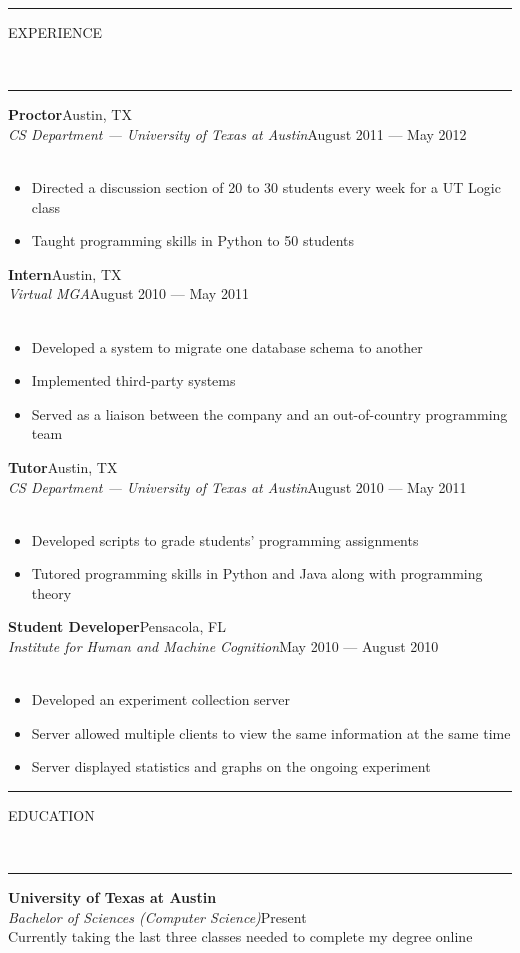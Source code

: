 \documentclass[10pt, letterpaper, oneside]{article}
\newcommand{\HRule}[2]{\textcolor{#1}{\rule{\linewidth}{#2}}}
\newcommand{\sectiontitle}[1]{\begin{minipage}{\textwidth}\HRule{black}{0.25mm}\vspace{-10pt}\begin{center}\Large\MakeUppercase{#1}\end{center}\end{minipage}\\\HRule{light-grey}{0.15mm}\vspace{\baselineskip}}
\newenvironment{ressection}[1]{
  \sectiontitle{#1}}
  {\vspace{-\baselineskip}}
\newenvironment{tightressection}[1]{
  \begin{minipage}{\textwidth}
  \sectiontitle{#1}}
  {\vspace{\baselineskip}\end{minipage}}
\newcommand{\resitem}[1]{
    \vspace{2pt}
    \item \begin{flushleft} #1 \end{flushleft}
}
\newcommand{\resedentry}[4]{
  \begin{minipage}{\textwidth}
  \vspace{-10pt}
  \textbf{#1}\\
  \textit{#2}\hfill\textcolor{light-grey}{#3}\\
  #4
  \vspace{0.5\baselineskip}
  \end{minipage}
}
\newcommand{\resentryheader}[5]{
    \vspace{-5pt}
    \textbf{#1}\hspace{\stretch{1}}\textcolor{light-grey}{#3}\\
    \textit{#2}\hspace{\stretch{1}}\textcolor{light-grey}{#4}\\
    \if\relax\detokenize{#5}\relax
    \else
      #5\\
    \fi
    \vspace{2pt}
}
\newenvironment{resentry}[5]{
  \begin{minipage}{\textwidth}
    \resentryheader{#1}{#2}{#3}{#4}{#5}
        \vspace{-\baselineskip}
    \begin{itemize}[noitemsep,nolistsep]
}{
    \end{itemize}
        \vspace{\baselineskip}
        \end{minipage}
}
\begin{document}
\begin{ressection}{experience}
  \begin{resentry}{Proctor}{CS Department --- University of Texas at Austin}{Austin, TX}{August 2011 --- May 2012}{}
    \resitem{Directed a discussion section of 20 to 30 students every week for a UT Logic class}
    \resitem{Taught programming skills in Python to 50 students}
  \end{resentry}
 
  \begin{resentry}{Intern}{Virtual MGA}{Austin, TX}{August 2010 --- May 2011}{}
    \resitem{Developed a system to migrate one database schema to another}
    \resitem{Implemented third-party systems}
    \resitem{Served as a liaison between the company and an out-of-country programming team}
  \end{resentry}
 
  \begin{resentry}{Tutor}{CS Department --- University of Texas at Austin}{Austin, TX}{August 2010 --- May 2011}{}
    \resitem{Developed scripts to grade students' programming assignments}
    \resitem{Tutored programming skills in Python and Java along with programming theory}
  \end{resentry}
 
  \begin{resentry}{Student Developer}{Institute for Human and Machine Cognition}{Pensacola, FL}{May 2010 --- August 2010}{}
    \resitem{Developed an experiment collection server}
    \resitem{Server allowed multiple clients to view the same information at the same time}
    \resitem{Server displayed statistics and graphs on the ongoing experiment}
  \end{resentry}
 
\end{ressection}
 


\vspace{15pt}
\begin{tightressection}{education}
  \resedentry{University of Texas at Austin}{Bachelor of Sciences (Computer Science)}{Present}{Currently taking the last three classes needed to complete my degree online}
\end{tightressection}
\end{document}

